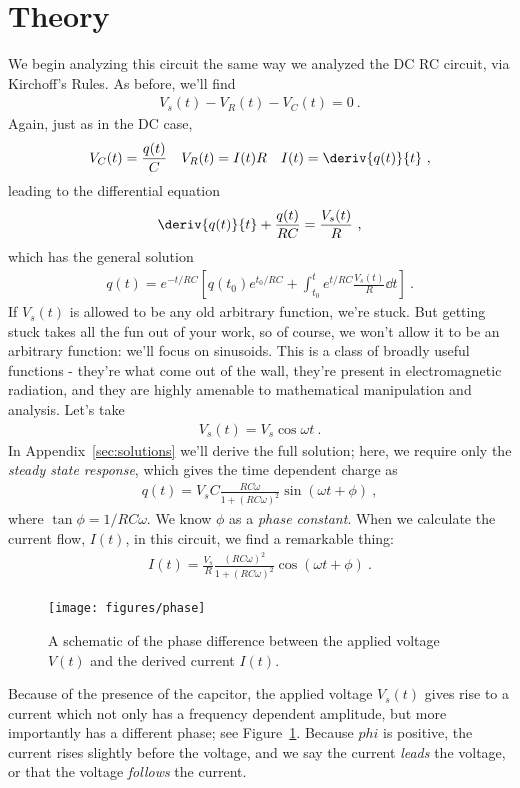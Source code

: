 \documentclass[12pt]{article}
\begin{document}
\section{Theory}
\label{sec:theory}

We begin analyzing this circuit the same way we analyzed the DC RC
circuit, via Kirchoff's Rules.  As before, we'll find
\begin{gather*}
  V_s(t) - V_R(t) - V_C(t) = 0\ .
\end{gather*}
Again, just as in the DC case,
\begin{align*}
  V_C(t) &= \frac{q(t)}{C} & V_R(t) &= I(t) R & I(t) =
  \deriv{q(t)}{t}\ ,
\end{align*}
leading to the differential equation
\begin{gather*}
  \deriv{q(t)}{t} + \frac{q(t)}{RC} = \frac{V_s(t)}{R}\ ,
\end{gather*}
which has the general solution
\begin{gather*}
  q(t) = e^{-t/RC} \left[ 
    q(t_0) e^{t_0/RC} + \int_{t_0}^t e^{t/RC} \frac{V_s(t)}{R} \dd t
\right]\ .
\end{gather*}
If $V_s(t)$ is allowed to be any old arbitrary function, we're stuck.
But getting stuck takes all the fun out of your work, so of course, we
won't allow it to be an arbitrary function: we'll focus on sinusoids.
This is a class of broadly useful functions - they're what come out of
the wall, they're present in electromagnetic radiation, and they are
highly amenable to mathematical manipulation and analysis.  Let's take 
\begin{gather*}
  V_s(t) = V_s \cos \omega t\ .
\end{gather*}
In Appendix~\ref{sec:solutions} we'll derive the full solution; here,
we require only the \textit{steady state response}, which gives the
time dependent charge as
\begin{gather*}
  q(t) = V_s C \frac{RC\omega}{1+(RC\omega)^2} \sin( \omega t + \phi)\ ,
\end{gather*}
where $\tan \phi = 1/RC\omega$.  We know $\phi$ as a \textit{phase
  constant}.  When we calculate the current flow, $I(t)$, in this
circuit, we find a remarkable thing:
\begin{gather*}
  I(t) = \frac{V_s}{R} \frac{(RC\omega)^2}{1+(RC\omega)^2} \cos(
  \omega t + \phi)\ .
\end{gather*}
\begin{figure}
  \centering
  \texttt{[image: figures/phase]}
  \caption{A schematic of the phase difference between the applied
    voltage $V(t)$ and the derived current $I(t)$.}
  \label{fig:phase}
\end{figure}
Because of the presence of the capcitor, the applied voltage $V_s(t)$
gives rise to a current which not only has a frequency dependent
amplitude, but more importantly has a different phase; see
Figure~\ref{fig:phase}.  Because $phi$ is positive, the current rises
slightly before the voltage, and we say the current \textit{leads} the
voltage, or that the voltage \textit{follows} the current.  
\end{document}
